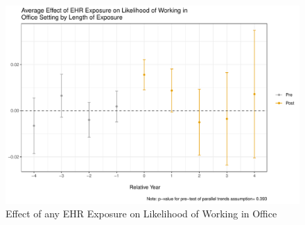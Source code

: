 \documentclass[11pt]{article}
\begin{document}
\begin{figure}[ht]
\caption{Effect of any EHR Exposure on Likelihood of Working in Office}
\vspace{2mm}
\centering
\hspace{20mm}
\includegraphics[scale=.45]{Objects/CS_office_ind_allEHR.pdf}
\vspace{3mm}
\newline
        \hspace{0.1cm}
\end{figure}
\end{document}
